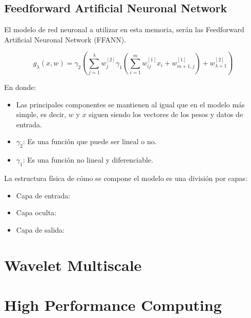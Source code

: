 \subsection{Feedforward Artificial Neuronal Network}

El modelo de red neuronal a utilizar en esta memoria, serán las Feedforward Artificial Neuronal Network (FFANN).

$$ g_{\lambda}(x,w) = \gamma_2 \left( \sum_{j = 1}^{\lambda} w_j^{[2]} \gamma_1 \left( \sum_{i = 1}^{m} w_{ij}^{[1]}x_i + w_{m+1,j}^{[1]} \right) + w_{\lambda+1}^{[2]} \right) $$

En donde:
\begin{itemize}
	\item Las principales componentes se mantienen al igual que en el modelo más simple, es decir, $w$ y $x$ siguen siendo los vectores de los pesos y datos de entrada.
	\item $\gamma_2$: Es una función que puede ser lineal o no.
	\item $\gamma_1$: Es una función no lineal y diferenciable.
\end{itemize}

La estructura física de cómo se compone el modelo es una división por capas:
\begin{itemize}
	\item Capa de entrada:
	\item Capa oculta:
	\item Capa de salida:
\end{itemize}

\section{Wavelet Multiscale}

\section{High Performance Computing}
